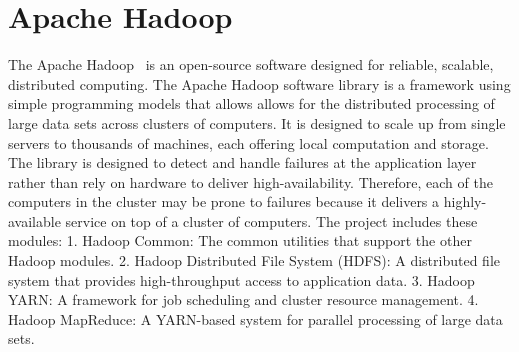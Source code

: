 \section{Apache Hadoop}

The Apache Hadoop~\cite{hid-sp18-515-www-hadoop} is an open-source 
software designed for reliable, scalable, distributed computing. 
The Apache Hadoop software library is a framework using simple programming 
models that allows allows for the distributed processing of large data sets across clusters of computers.
It is designed to scale up from single servers to thousands of machines, 
each offering local computation and storage.
The library is designed to detect and handle failures at the application 
layer rather than rely on hardware to deliver high-availability.
Therefore, each of the computers in the cluster may be prone to failures 
because it delivers a highly-available service on top of a cluster of computers. 
The project includes these modules:
1. Hadoop Common:
The common utilities that support the other Hadoop modules.
2. Hadoop Distributed File System (HDFS):
A distributed file system that provides high-throughput access to 
application data.
3. Hadoop YARN:
A framework for job scheduling and cluster resource management. 
4. Hadoop MapReduce: 
A YARN-based system for parallel processing of large data sets.
